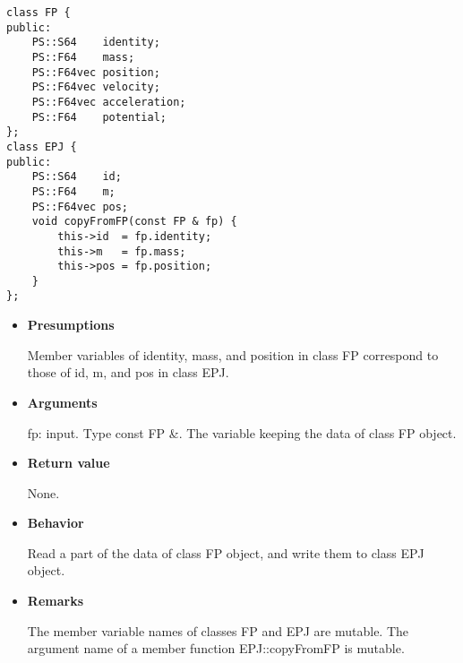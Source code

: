 
\begin{screen}
\begin{verbatim}
class FP {
public:
    PS::S64    identity;
    PS::F64    mass;
    PS::F64vec position;
    PS::F64vec velocity;
    PS::F64vec acceleration;
    PS::F64    potential;
};
class EPJ {
public:
    PS::S64    id;
    PS::F64    m;
    PS::F64vec pos;
    void copyFromFP(const FP & fp) {
        this->id  = fp.identity;
        this->m   = fp.mass;
        this->pos = fp.position;
    }
};
\end{verbatim}
\end{screen}

\begin{itemize}

\item {\bf Presumptions}

  Member variables of identity, mass, and position in class FP
  correspond to those of id, m, and pos in class EPJ.

\item {\bf Arguments}

  fp: input. Type const FP \&. The variable keeping the data of class
  FP object.
  
\item {\bf Return value}

  None.
  
\item {\bf Behavior}

  Read a part of the data of class FP object, and write them to class
  EPJ object.
  
\item {\bf Remarks}

  The member variable names of classes FP and EPJ are mutable. The
  argument name of a member function EPJ::copyFromFP is mutable.

\end{itemize}

